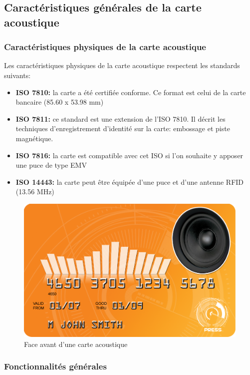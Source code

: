 
\subsection{Caractéristiques générales de la carte acoustique}

\subsubsection{Caractéristiques physiques de la carte acoustique}
Les caractéristiques physiques de la carte acoustique respectent les standards suivants:\\

\begin{itemize}
\item \textbf{ISO 7810:} la carte a été certifiée conforme. Ce format est celui de la carte bancaire (85.60 x 53.98 mm)
\item \textbf{ISO 7811:} ce standard est une extension de l’ISO 7810. Il décrit les techniques d’enregistrement d’identité sur la carte: embossage et piste magnétique.
\item \textbf{ISO 7816:} la carte est compatible avec cet ISO si l’on souhaite y apposer une puce de type EMV
\item \textbf{ISO 14443:} la carte peut être équipée d’une puce et d’une antenne RFID (13.56 MHz)
\end{itemize}

\begin{figure}[!htbp]
  \centering
    \includegraphics[scale=0.5]{images/carteavant}
  \caption{Face avant d’une carte acoustique}
\end{figure}


\subsubsection{Fonctionnalités générales}

